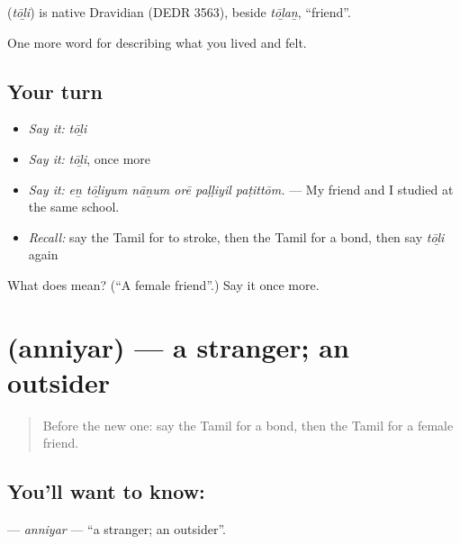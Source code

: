 \begin{cousinweb}
\textbf{} (\emph{tōḻi}) is native Dravidian (DEDR 3563), beside  \emph{tōḻaṉ}, \textquotedblleft{}friend\textquotedblright{}.
\end{cousinweb}

\begin{grammarlens}[title={What you've built}]
One more word for describing what you lived and felt.
\end{grammarlens}

\subsection*{Your turn}
\begin{itemize}
\raggedright
  \item \emph{Say it:} \emph{tōḻi}
  \item \emph{Say it:} \emph{tōḻi}, once more
  \item \emph{Say it:} \emph{eṉ tōḻiyum nāṉum orē paḷḷiyil paṭittōm.} — My friend and I studied at the same school.
  \item \emph{Recall:} say the Tamil for to stroke, then the Tamil for a bond, then say \emph{tōḻi} again
\end{itemize}

\begin{tcolorbox}[breakable,colback=teal!4,colframe=teal!35!black,title={Before you move on}]
What does  mean? (\textquotedblleft{}A female friend\textquotedblright{}.) Say it once more.
\end{tcolorbox}
\section[\texorpdfstring{\ta{அந்நியர்} (anniyar)}{அந்நியர் (anniyar)}]{ (anniyar) — a stranger; an outsider}

\label{lesson:TA-C503-anniyar}



\begin{quote}
Before the new one: say the Tamil for a bond, then the Tamil for a female friend.
\end{quote}

\subsection*{You'll want to know: }
\textbf{} — \emph{anniyar} — \textquotedblleft{}a stranger; an outsider\textquotedblright{}.

